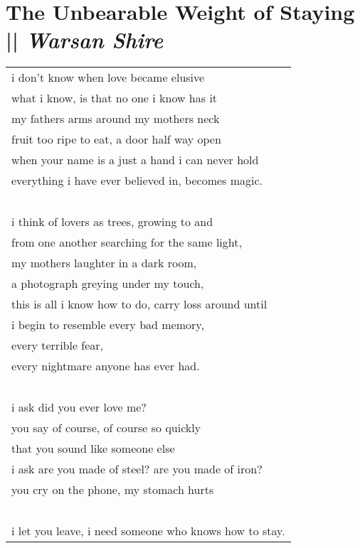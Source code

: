 
\section[The Unbearable Weight of Staying]{The Unbearable Weight of Staying || \emph{Warsan Shire} \hspace*{\fill}  \thepage}
\label{sec:The_Unbearable_Weight_of_Staying.tex}
\vspace*{0.8cm}
\begin{center}
\begin{tabular}{l}
i don’t know when love became elusive\\
what i know, is that no one i know has it\\
my fathers arms around my mothers neck\\
fruit too ripe to eat, a door half way open\\
when your name is a just a hand i can never hold\\
everything i have ever believed in, becomes magic.\\
\-\ \\
i think of lovers as trees, growing to and\\
from one another searching for the same light,\\
my mothers laughter in a dark room,\\
a photograph greying under my touch,\\
this is all i know how to do, carry loss around until\\
i begin to resemble every bad memory,\\
every terrible fear,\\
every nightmare anyone has ever had.\\
\-\ \\
i ask did you ever love me?\\
you say of course, of course so quickly\\
that you sound like someone else\\
i ask are you made of steel? are you made of iron?\\
you cry on the phone, my stomach hurts\\
\-\ \\
i let you leave, i need someone who knows how to stay.
\end{tabular}
\end{center}